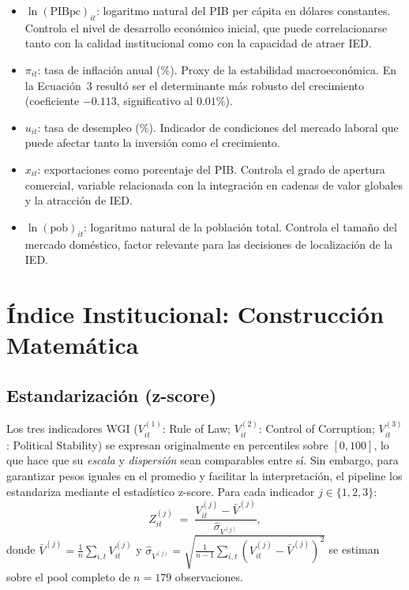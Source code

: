 \documentclass[12pt, a4paper]{article}
\theoremstyle{definition}
\begin{document}
\begin{itemize}
  \item $\ln(\text{PIBpc})_{it}$: logaritmo natural del PIB per cápita en dólares constantes. Controla el nivel de desarrollo económico inicial, que puede correlacionarse tanto con la calidad institucional como con la capacidad de atraer IED.
  \item $\pi_{it}$: tasa de inflación anual (\%). Proxy de la estabilidad macroeconómica. En la Ecuación~3 resultó ser el determinante más robusto del crecimiento (coeficiente $-0.113$, significativo al $0.01\%$).
  \item $u_{it}$: tasa de desempleo (\%). Indicador de condiciones del mercado laboral que puede afectar tanto la inversión como el crecimiento.
  \item $x_{it}$: exportaciones como porcentaje del PIB. Controla el grado de apertura comercial, variable relacionada con la integración en cadenas de valor globales y la atracción de IED.
  \item $\ln(\text{pob})_{it}$: logaritmo natural de la población total. Controla el tamaño del mercado doméstico, factor relevante para las decisiones de localización de la IED.
\end{itemize}

\section{Índice Institucional: Construcción Matemática}

\subsection{Estandarización (z-score)}
\label{sec:zscore}

Los tres indicadores WGI ($V^{(1)}_{it}$: Rule of Law; $V^{(2)}_{it}$: Control of Corruption; $V^{(3)}_{it}$: Political Stability) se expresan originalmente en percentiles sobre $[0,100]$, lo que hace que su \emph{escala} y \emph{dispersión} sean comparables entre sí. Sin embargo, para garantizar pesos iguales en el promedio y facilitar la interpretación, el pipeline los estandariza mediante el estadístico z-score. Para cada indicador $j \in \{1,2,3\}$:
\[
  Z^{(j)}_{it} \;=\; \frac{V^{(j)}_{it} - \bar{V}^{(j)}}{\hat{\sigma}_{V^{(j)}}},
\]
donde $\bar{V}^{(j)} = \frac{1}{n}\sum_{i,t} V^{(j)}_{it}$ y $\hat{\sigma}_{V^{(j)}} = \sqrt{\frac{1}{n-1}\sum_{i,t}(V^{(j)}_{it}-\bar{V}^{(j)})^2}$ se estiman sobre el pool completo de $n=179$ observaciones.
\end{document}
